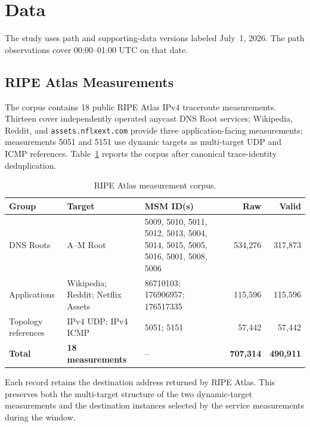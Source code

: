 \section{Data}
\label{sec:datasets}

The study uses path and supporting-data versions labeled July~1, 2026. The
path observations cover 00:00--01:00 UTC on that date.

\subsection{RIPE Atlas Measurements}

The corpus contains 18 public RIPE Atlas IPv4 traceroute measurements.
Thirteen cover independently operated anycast DNS Root services; Wikipedia,
Reddit, and \texttt{assets.nflxext.com} provide three application-facing
measurements; measurements 5051 and 5151 use dynamic targets as multi-target
UDP and ICMP references. Table~\ref{tab:atlas_measurements} reports the corpus
after canonical trace-identity deduplication.

\begin{table}[t]
  \centering
  \caption{RIPE Atlas measurement corpus.}
  \label{tab:atlas_measurements}
  \footnotesize
  \setlength{\tabcolsep}{4.2pt}
  \begin{tabular}{p{}p{}p{}rr}
    \toprule
    Group & Target & MSM ID(s) & Raw & Valid \\
    \midrule
    DNS Roots & A--M Root
      & 5009, 5010, 5011, 5012, 5013, 5004, 5014, 5015, 5005, 5016,
        5001, 5008, 5006
      & 534,276 & 317,873 \\
    Applications & Wikipedia; Reddit; Netflix Assets
      & 86710103; 176906957; 176517335
      & 115,596 & 115,596 \\
    Topology references & IPv4 UDP; IPv4 ICMP
      & 5051; 5151
      & 57,442 & 57,442 \\
    \midrule
    \textbf{Total} & \textbf{18 measurements} & --
      & \textbf{707,314} & \textbf{490,911} \\
    \bottomrule
  \end{tabular}
\end{table}

Each record retains the destination address returned by RIPE Atlas. This
preserves both the multi-target structure of the two dynamic-target
measurements and the destination instances selected by the service
measurements during the window.

